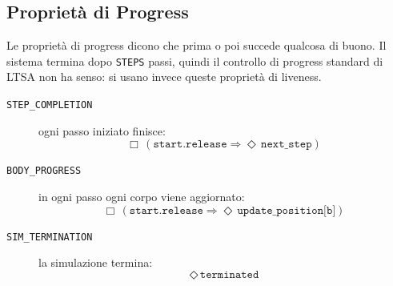 \subsection{Proprietà di Progress}
Le proprietà di progress dicono che prima o poi succede qualcosa di buono.
Il sistema termina dopo \texttt{STEPS} passi, quindi il controllo di progress standard di LTSA non ha senso: si usano invece queste proprietà di liveness.
\begin{description}
  \item[\texttt{STEP\_COMPLETION}] ogni passo iniziato finisce:
    \[\Box\,(\texttt{start.release} \Rightarrow \Diamond\,\texttt{next\_step})\]
  \item[\texttt{BODY\_PROGRESS}] in ogni passo ogni corpo viene aggiornato:
    \[\Box\,(\texttt{start.release} \Rightarrow \Diamond\,\texttt{update\_position[b]})\]
  \item[\texttt{SIM\_TERMINATION}] la simulazione termina:
    \[\Diamond\,\texttt{terminated}\]
\end{description}
